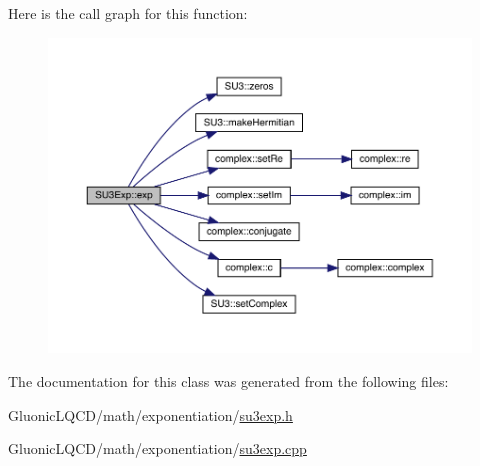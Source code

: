 Here is the call graph for this function\+:\nopagebreak
\begin{figure}[H]
\begin{center}
\leavevmode
\includegraphics[width=350pt]{class_s_u3_exp_a9760c17b9c3a4b6d0a5cd4d88c6d577e_cgraph}
\end{center}
\end{figure}


The documentation for this class was generated from the following files\+:\begin{DoxyCompactItemize}
\item 
Gluonic\+L\+Q\+C\+D/math/exponentiation/\mbox{\hyperlink{su3exp_8h}{su3exp.\+h}}\item 
Gluonic\+L\+Q\+C\+D/math/exponentiation/\mbox{\hyperlink{su3exp_8cpp}{su3exp.\+cpp}}\end{DoxyCompactItemize}
